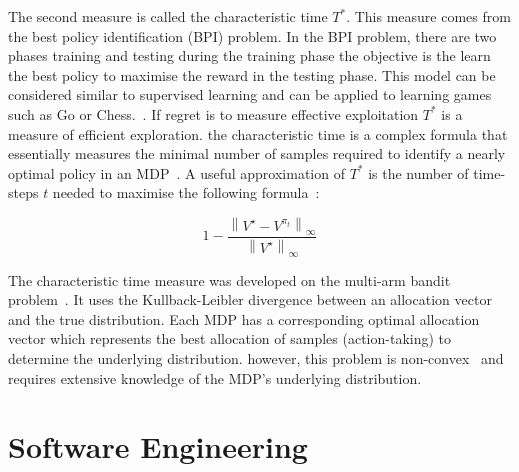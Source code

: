 \documentclass[]{final_report}
\begin{document}
\label{bpi-introduction}
The second measure is called the characteristic time $T^*$. This measure comes from the best policy identification (BPI) problem. In the BPI problem, there are two phases training and testing during the training phase the objective is the learn the best policy to maximise the reward in the testing phase. This model can be considered similar to supervised learning and can be applied to learning games such as Go or Chess.~\cite{bestPolicyIdentifaction}. If regret is to measure effective exploitation $T^*$ is a measure of efficient exploration. the characteristic time is a complex formula that essentially measures the minimal number of samples required to identify a nearly optimal policy in an MDP~\cite{characteristicTime}. A useful approximation of $T^*$ is the number of time-steps $t$ needed to maximise the following formula~\cite{modelFree}:

\begin{equation}
  1- \frac{ \left\|V^\star-V^{\pi_t} \right\|_\infty}{\left\|V^\star\right\|_\infty}
  \label{eqn:characteristic-time-aproximation}
\end{equation}
 
The characteristic time measure was developed on the multi-arm bandit problem~\cite{characteristicTime}. It uses the Kullback-Leibler divergence between an allocation vector and the true distribution. Each MDP has a corresponding optimal allocation vector which represents the best allocation of samples (action-taking) to determine the underlying distribution. however, this problem is non-convex~\cite{characteristicTimeNonConvex} and requires extensive knowledge of the MDP's underlying distribution.

\chapter{Software Engineering}
\end{document}
